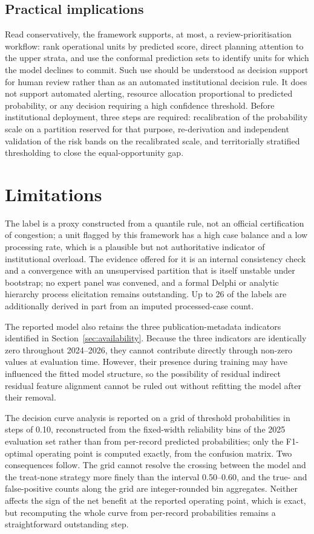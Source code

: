 \documentclass[sn-vancouver,Numbered]{sn-jnl}
\begin{document}
\subsection{Practical implications}

Read conservatively, the framework supports, at most, a review-prioritisation workflow: rank operational units by predicted score, direct planning attention to the upper strata, and use the conformal prediction sets to identify units for which the model declines to commit. Such use should be understood as decision support for human review rather than as an automated institutional decision rule. It does not support automated alerting, resource allocation proportional to predicted probability, or any decision requiring a high confidence threshold. Before institutional deployment, three steps are required: recalibration of the probability scale on a partition reserved for that purpose, re-derivation and independent validation of the risk bands on the recalibrated scale, and territorially stratified thresholding to close the equal-opportunity gap.

\section{Limitations}\label{sec:limits}

The label is a proxy constructed from a quantile rule, not an official certification of congestion; a unit flagged by this framework has a high case balance and a low processing rate, which is a plausible but not authoritative indicator of institutional overload. The evidence offered for it is an internal consistency check and a convergence with an unsupervised partition that is itself unstable under bootstrap; no expert panel was convened, and a formal Delphi or analytic hierarchy process elicitation remains outstanding. Up to 26 of the labels are additionally derived in part from an imputed processed-case count.

The reported model also retains the three publication-metadata indicators identified in Section~\ref{sec:availability}. Because the three indicators are identically zero throughout 2024--2026, they cannot contribute directly through non-zero values at evaluation time. However, their presence during training may have influenced the fitted model structure, so the possibility of residual indirect residual feature alignment cannot be ruled out without refitting the model after their removal.

The decision curve analysis is reported on a grid of threshold probabilities in steps of 0.10, reconstructed from the fixed-width reliability bins of the 2025 evaluation set rather than from per-record predicted probabilities; only the F1-optimal operating point is computed exactly, from the confusion matrix. Two consequences follow. The grid cannot resolve the crossing between the model and the treat-none strategy more finely than the interval 0.50--0.60, and the true- and false-positive counts along the grid are integer-rounded bin aggregates. Neither affects the sign of the net benefit at the reported operating point, which is exact, but recomputing the whole curve from per-record probabilities remains a straightforward outstanding step.
\end{document}
